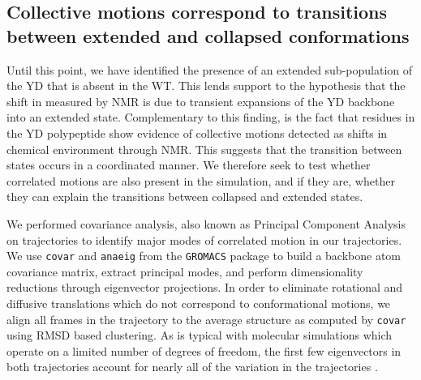 \begin{figure}
\centering     %
{}

\label{fig:contacts}
\end{figure}


\subsection{Collective motions correspond to transitions between extended and collapsed conformations}

Until this point, we have identified the presence of an extended sub-population of the YD \gct that is absent in the WT. This lends support to the hypothesis that the shift in \diffusion measured by NMR is due to transient expansions of the YD backbone into an extended state. Complementary to this finding, is the fact that residues in the YD polypeptide show evidence of collective motions detected as shifts in chemical environment through NMR. This suggests that the transition between states occurs in a coordinated manner. We therefore seek to test whether correlated motions are also present in the simulation, and if they are, whether they can explain the transitions between collapsed and extended states.

We performed covariance analysis, also known as Principal Component Analysis on \gct trajectories to identify major modes of correlated motion in our trajectories. We use \texttt{covar} and \texttt{anaeig} from the \texttt{GROMACS} package to build a backbone atom covariance matrix, extract principal modes, and perform dimensionality reductions through eigenvector projections. In order to eliminate rotational and diffusive  translations which do not correspond to conformational motions, we align all frames in the trajectory to the average structure as computed by \texttt{covar} using RMSD based clustering. As is typical with molecular simulations which operate on a limited number of degrees of freedom, the first few eigenvectors in both trajectories account for nearly all of the variation in the trajectories . 

